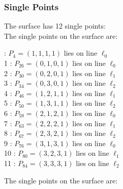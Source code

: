 \documentclass{article}
\begin{document}
{\subsubsection*{Single Points}
The surface has 12 single points:\\
The single points on the surface are:\\
\begin{multicols}{2}
 : $P_{4}=( 1, 1, 1, 1 )$ lies on line $\ell_{0}$\\
1 : $P_{26}=( 0, 1, 0, 1 )$ lies on line $\ell_{0}$\\
2 : $P_{30}=( 0, 2, 0, 1 )$ lies on line $\ell_{1}$\\
3 : $P_{34}=( 0, 3, 0, 1 )$ lies on line $\ell_{2}$\\
4 : $P_{46}=( 1, 2, 1, 1 )$ lies on line $\ell_{1}$\\
5 : $P_{50}=( 1, 3, 1, 1 )$ lies on line $\ell_{2}$\\
6 : $P_{59}=( 2, 1, 2, 1 )$ lies on line $\ell_{0}$\\
7 : $P_{63}=( 2, 2, 2, 1 )$ lies on line $\ell_{1}$\\
8 : $P_{67}=( 2, 3, 2, 1 )$ lies on line $\ell_{2}$\\
9 : $P_{76}=( 3, 1, 3, 1 )$ lies on line $\ell_{0}$\\
10 : $P_{80}=( 3, 2, 3, 1 )$ lies on line $\ell_{1}$\\
11 : $P_{84}=( 3, 3, 3, 1 )$ lies on line $\ell_{2}$\\
\end{multicols}
The single points on the surface are:\\
}
\end{document}

